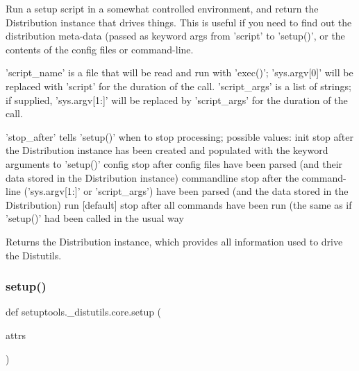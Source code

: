 \begin{DoxyVerb}Run a setup script in a somewhat controlled environment, and
return the Distribution instance that drives things.  This is useful
if you need to find out the distribution meta-data (passed as
keyword args from 'script' to 'setup()', or the contents of the
config files or command-line.

'script_name' is a file that will be read and run with 'exec()';
'sys.argv[0]' will be replaced with 'script' for the duration of the
call.  'script_args' is a list of strings; if supplied,
'sys.argv[1:]' will be replaced by 'script_args' for the duration of
the call.

'stop_after' tells 'setup()' when to stop processing; possible
values:
  init
    stop after the Distribution instance has been created and
    populated with the keyword arguments to 'setup()'
  config
    stop after config files have been parsed (and their data
    stored in the Distribution instance)
  commandline
    stop after the command-line ('sys.argv[1:]' or 'script_args')
    have been parsed (and the data stored in the Distribution)
  run [default]
    stop after all commands have been run (the same as if 'setup()'
    had been called in the usual way

Returns the Distribution instance, which provides all information
used to drive the Distutils.
\end{DoxyVerb}
 \mbox{\label{namespacesetuptools_1_1__distutils_1_1core_a6f94e9f9536e6b558c2f6e7a0077ec47}} 
\subsubsection{\texorpdfstring{setup()}{setup()}}
{\footnotesize\ttfamily def setuptools.\+\_\+distutils.\+core.\+setup (\begin{DoxyParamCaption}\item[{}]{attrs }\end{DoxyParamCaption})}

